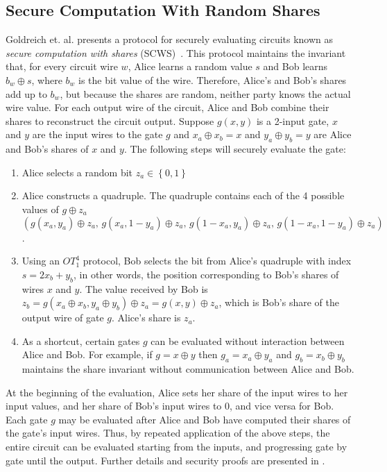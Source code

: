 \subsection{Secure Computation With Random Shares \label{sub:SCWS}}

Goldreich et. al.  presents a protocol for securely evaluating circuits
known as \emph{secure computation with shares} (SCWS)~\cite{GMW87}. This protocol
maintains the invariant that, for every circuit wire $w$, Alice learns
a random value $s$ and Bob learns $b_{w}\oplus s$, where $b_{w}$
is the bit value of the wire. Therefore, Alice's and Bob's shares
add up to $b_{w}$, but because the shares are random, neither party
knows the actual wire value. For each output wire of the circuit,
Alice and Bob combine their shares to reconstruct the circuit output.
Suppose $g(x,y)$ is a 2-input gate, $x$ and $y$ are the input wires
to the gate $g$ and $x_{a}\oplus x_{b}=x$ and $y_{a}\oplus y_{b}=y$
are Alice and Bob's shares of $x$ and $y$. The following steps will
securely evaluate the gate: 
\begin{enumerate}
\item Alice selects a random bit $z_{a}\in\left\{ 0,1\right\} $ 
\item Alice constructs a quadruple. The quadruple contains each of the 4
possible values of $g\oplus z_{a}$\\
$\left(g(x_{a},y_{a})\oplus z_{a},\, g(x_{a},1-y_{a})\oplus z_{a},\, g(1-x_{a},y_{a})\oplus z_{a},\, g(1-x_{a},1-y_{a})\oplus z_{a}\right)$. 
\item Using an $OT_{1}^{4}$ protocol, Bob selects the bit from Alice's
quadruple with index $s=2x_{b}+y_{b}$, in other words, the position
corresponding to Bob's shares of wires $x$ and $y$. The value received
by Bob is $z_{b}=g(x_{a}\oplus x_{b},y_{a}\oplus y_{b})\oplus z_{a}=g(x,y)\oplus z_{a}$,
which is Bob's share of the output wire of gate $g$. Alice's share
is $z_{a}$.
\item As a shortcut, certain gates $g$ can be evaluated without interaction
between Alice and Bob. For example, if $g=x\oplus y$ then $g_{a}=x_{a}\oplus y_{a}$
and $g_{b}=x_{b}\oplus y_{b}$ maintains the share invariant without
communication between Alice and Bob.
\end{enumerate}
At the beginning of the evaluation, Alice sets her share of the input
wires to her input values, and her share of Bob's input wires to $0$,
and vice versa for Bob. Each gate $g$ may be evaluated after Alice
and Bob have computed their shares of the gate's input wires. Thus,
by repeated application of the above steps, the entire circuit can be evaluated
starting from the inputs, and progressing gate by gate until the output.
Further details and security proofs are presented in \cite{Goldreich:vol2}.

